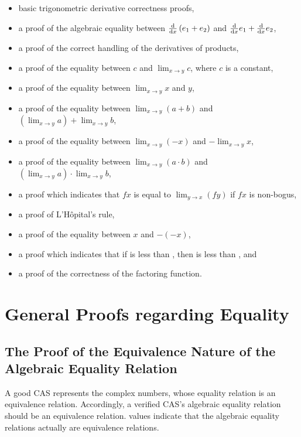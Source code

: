 \documentclass{report}
\begin{document}
\begin{itemize}
 \item basic trigonometric derivative correctness proofs,
 \item a proof of the algebraic equality between \(\derivative{x} \left(e_1 + e_2\right)\) and \(\derivative{x} e_1 + \derivative{x} e_2\),
 \item a proof of the correct handling of the derivatives of products,
 \item a proof of the equality between \(c\) and \(\lim_{x \rightarrow y} c\), where \(c\) is a constant,
 \item a proof of the equality between \(\lim_{x \rightarrow y} x\) and \(y\),
 \item a proof of the equality between \(\lim_{x \rightarrow y} \left(a + b\right)\) and \(\left(\lim_{x \rightarrow y} a\right) + \lim_{x \rightarrow y} b\),
 \item a proof of the equality between \(\lim_{x \rightarrow y} \left(- x\right)\) and \(- \lim_{x \rightarrow y} x\),
 \item a proof of the equality between \(\lim_{x \rightarrow y} \left(a \cdot b\right)\) and \(\left(\lim_{x \rightarrow y} a\right) \cdot \lim_{x \rightarrow y} b\),
 \item a proof which indicates that \(f x\) is equal to \(\lim_{y \rightarrow x} \left(f y\right)\) if \(f x\) is non-bogus,
 \item a proof of L'H\^opital's rule,
 \item a proof of the equality between \(x\) and \(- \left(- x\right)\),
 \item a proof which indicates that if  is less than , then   is less than  , and
 \item a proof of the correctness of the factoring function.
\end{itemize}

\section{General Proofs regarding Equality}

\subsection{The Proof of the Equivalence Nature of the Algebraic Equality Relation}
A good CAS represents the complex numbers, whose equality relation is an equivalence relation.  Accordingly, a verified CAS's algebraic equality relation should be an equivalence relation.   values indicate that the algebraic equality relations actually are equivalence relations.
\end{document}
